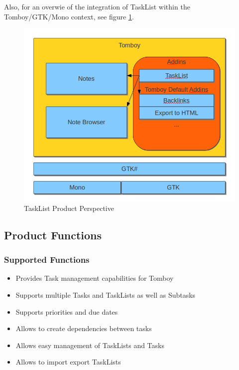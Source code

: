   Also, for an overwie of the integration of TaskList within the Tomboy/GTK/Mono context, see figure \ref{perspective}.

  \begin{figure}[h]
    \includegraphics[width=\textwidth]{graphics/product_perspective_diagram.png}
    \caption{TaskList Product Perspective}
    \label{perspective}
  \end{figure}


\subsection{Product Functions}
\label{description:functions}

  \subsubsection*{Supported Functions}
  \label{description:functions:supported}

    \begin{itemize}
      \item Provides Task management capabilities for Tomboy
      \item Supports multiple Tasks and TaskLists as well as Subtasks
      \item Supports priorities and due dates
      \item Allows to create dependencies between tasks
      \item Allows easy management of TaskLists and Tasks
      \item Allows to import export TaskLists
    \end{itemize}

